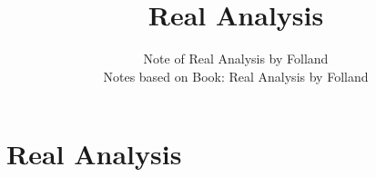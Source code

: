 \documentclass[11pt]{article}
\title{Real Analysis}
\subtitle{Note of Real Analysis by Folland\\\small Notes based on Book: Real Analysis by Folland}
\begin{document}
\makecover
\makenotecontents

\section{Real Analysis}
\mbox{}\par
\end{document}
